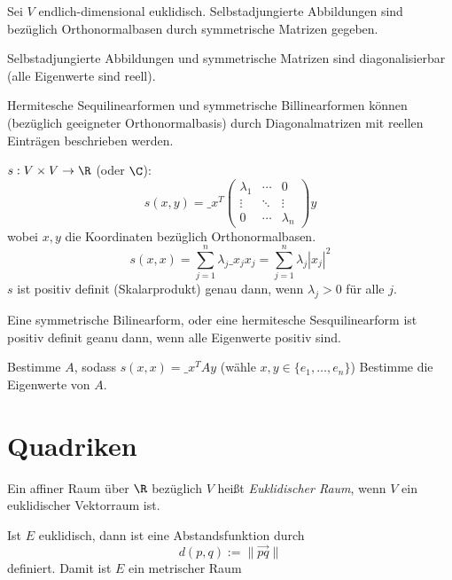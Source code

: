 \documentclass{mycourse}
\begin{document}
\begin{kor}
	\label{kor:13.29}
	Sei $V$ endlich-dimensional euklidisch.
	Selbstadjungierte Abbildungen sind bezüglich Orthonormalbasen durch symmetrische Matrizen gegeben.

	Selbstadjungierte Abbildungen und symmetrische Matrizen sind diagonalisierbar (alle Eigenwerte sind reell).
\end{kor}

Hermitesche Sequilinearformen und symmetrische Billinearformen können (bezüglich geeigneter Orthonormalbasis) durch Diagonalmatrizen mit reellen Einträgen beschrieben werden.

$s:V\times V\to \R$ (oder $\C$):
\[
	s(x,y) = \_x^T \begin{pmatrix}\lambda_1 & \cdots & 0 \\ \vdots & \ddots & \vdots \\ 0 &\cdots & \lambda_n\end{pmatrix}y
\]
wobei $x,y$ die Koordinaten bezüglich Orthonormalbasen.
\[
	s(x,x) = \sum_{j=1}^n \lambda_j \_x_j x_j = \sum_{j=1}^n \lambda_j |x_j|^2
\]
$s$ ist positiv definit (Skalarprodukt) genau dann, wenn $\lambda_j > 0$ für alle $j$.

\begin{kor}
	\label{kor:13.30}
	Eine symmetrische Bilinearform, oder eine hermitesche Sesquilinearform ist positiv definit geanu dann, wenn alle Eigenwerte positiv sind.
\end{kor}

\begin{alg*}
	\begin{algorithmic}
		\State Bestimme $A$, sodass $s(x,x) = \_x^TAy$ (wähle $x,y\in \{e_1,\dotsc,e_n\}$)
		\State Bestimme die Eigenwerte von $A$.
	\end{algorithmic}
\end{alg*}


\chapter{Quadriken}


\begin{df}
	\label{df:14.1}
	Ein affiner Raum über $\R$ bezüglich $V$ heißt \emph{Euklidischer Raum}, wenn $V$ ein euklidischer Vektorraum ist.
\end{df}

Ist $E$ euklidisch, dann ist eine Abstandsfunktion durch
\[
	d(p,q) := \|\vec{pq}\|
\]
definiert.
Damit ist $E$ ein metrischer Raum
\end{document}
